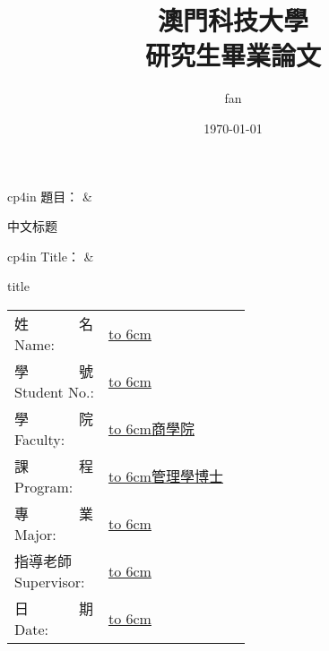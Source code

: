 \documentclass[14pt, a4paper,openany]{ctexbook} %
\title{澳門科技大學\\
  研究生畢業論文}
\author{fan }
\date{\today}
\newcommand{\sihao}{\fontsize{14pt}{\baselineskip}\selectfont}%
\newcommand{\sanhao}{\fontsize{15.75pt}{\baselineskip}\selectfont} %
\numberwithin{figure}{chapter}
\numberwithin{table}{chapter}
\begin{document}
\sihao\linespread{1.1} \parskip=0pt
\begin{titlepage}




\thispagestyle{empty}
\vspace*{3cm}
 \begin{center}


\newcommand{\PreserveBackslash}[1]{\let\temp=\\#1\let\\=\temp}
\begin{tabular}{cp{4in}}  %
題目： & \PreserveBackslash\raggedright  %
   中文标题\\
\end{tabular}

\vspace{1cm}

\begin{tabular}{cp{4in}}
Title： & \PreserveBackslash\raggedright
   title \\
\end{tabular}


 \vspace{1cm}

\end{center}
\newcommand{\unline}[2][6cm]{\underline{\hbox to #1{\hfill #2 \hfill}}}

\begin{center}
{\fontsize{12pt}{\baselineskip}\selectfont
 \vspace{2cm}
\begin{center}
\begin{table}[htbp]
  \centering
    \begin{tabular}{llr}
    	\makecell*[l{p{8em}}]{ \sanhao 姓\ \ ~~~~~名\\ \sanhao Name}:    & \unline{\sanhao  } \\
    	\makecell*[l{p{8em}}]{ \sanhao 學\ \ ~~~~~號\\ \sanhao Student No.}: & \unline{\sanhao  } \\
    	\makecell*[l{p{8em}}]{ \sanhao 學\ \ ~~~~~院\\ \sanhao Faculty}: & \unline{\sanhao 商學院} \\
    	\makecell*[l{p{8em}}]{ \sanhao 課\ \ ~~~~~程\\ \sanhao Program}: & \unline{\sanhao 管理學博士} \\
    	\makecell*[l{p{8em}}]{ \sanhao 專\ \ ~~~~~業\\ \sanhao Major}: & \unline{\sanhao  } \\
    	\makecell*[l{p{8em}}]{ \sanhao 指導老師\\ \sanhao Supervisor}: & \unline{\sanhao   } \\
    	\makecell*[l{p{8em}}]{ \sanhao 日\ \ ~~~~~期\\ \sanhao Date}: & \unline{\sanhao  } \\
    \end{tabular}%


\end{table}
\end{center}}
\end{center}
\end{titlepage}
\end{document}
